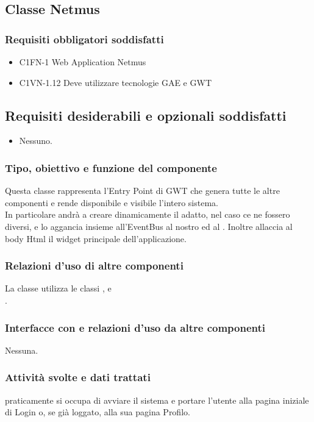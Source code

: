 \subsection{Classe Netmus}
\subsubsection*{Requisiti obbligatori soddisfatti}
\begin{itemize}
	\item C1FN-1 Web Application Netmus
	\item C1VN-1.12 Deve utilizzare tecnologie GAE e GWT
\end{itemize}
\subsection*{Requisiti desiderabili e opzionali soddisfatti}
\begin{itemize}
  \item Nessuno.
\end{itemize}
\subsubsection*{Tipo, obiettivo e funzione del componente}
Questa classe rappresenta l'Entry Point di GWT che genera tutte le altre
componenti e rende disponibile e visibile l'intero sistema.\\
In particolare andr\`a a creare dinamicamente il  adatto,
nel caso ce ne fossero diversi, e lo aggancia insieme all'EventBus al nostro
 ed al .
Inoltre allaccia al body Html il widget principale dell'applicazione.
\subsubsection*{Relazioni d'uso di altre componenti}
La classe  utilizza le classi ,
 e \\.
\subsubsection*{Interfacce con e relazioni d'uso da altre componenti}
Nessuna.
\subsubsection*{Attivit\`a svolte e dati trattati}
 praticamente si occupa di avviare il sistema e portare l'utente alla
pagina iniziale di Login o, se gi\`a loggato, alla sua pagina Profilo.


